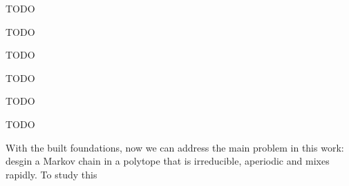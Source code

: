 \begin{definition}
TODO
\end{definition}

\begin{definition}
TODO
\end{definition}

\begin{definition}
TODO
\end{definition}

\begin{theorem}
TODO
\end{theorem}

\begin{definition}
TODO
\end{definition}

\begin{definition}
TODO
\end{definition}

\begin{definition}
\end{definition}

With the built foundations, now we can address the main problem in this work: desgin a Markov chain in a polytope that is irreducible, aperiodic and mixes rapidly. To study this
